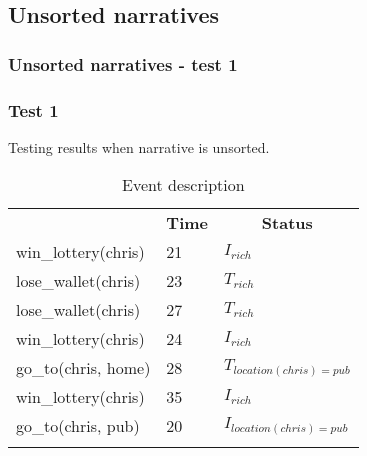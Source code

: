 \documentclass[8pt]{beamer}
\begin{document}
\subsection{Unsorted narratives}
\begin{frame}
    \frametitle{Unsorted narratives - test 1}
    \subsubsection{Test 1}
    \small
    Testing results when narrative is unsorted.\linebreak
    \begin{minipage}{0.48\linewidth}
        \begin{table}[t!]
            \caption{Event description}
            \begin{center}

                \begin{tabular}{lll}
                    \hline\noalign{\smallskip}
                    \multicolumn{1}{l}{\textbf{Event}} & \multicolumn{1}{c}{\textbf{Time}} & \multicolumn{1}{c}{\textbf{Status}}  \\
                    win\_lottery(chris)&21 &$I_{rich}$\\
                    lose\_wallet(chris)& 23 &$T_{rich}$\\
                    lose\_wallet(chris)& 27 &$T_{rich}$\\
                    win\_lottery(chris)& 24 &$I_{rich}$\\
                    go\_to(chris, home)& 28 &$T_{location(chris)=pub}$\\
                    win\_lottery(chris)& 35&$I_{rich}$\\
                    go\_to(chris, pub)& 20 & $I_{location(chris)=pub}$\\
                    \noalign{\smallskip}
                    \hline
                \end{tabular}
            \end{center}
        \end{table}
    \end{minipage}
    \begin{minipage}{0.48\linewidth}


\end{minipage}
\end{frame}
\end{document}
